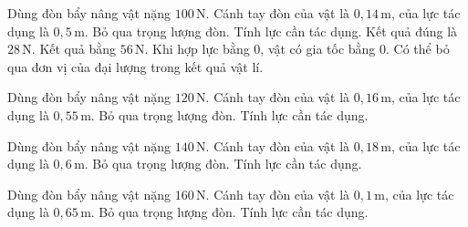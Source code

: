 \begin{ex}
Dùng đòn bẩy nâng vật nặng $100\,\text{N}$. Cánh tay đòn của vật là $0,14\,\text{m}$, của lực tác dụng là $0,5\,\text{m}$. Bỏ qua trọng lượng đòn. Tính lực cần tác dụng.
\choiceTF
{\True Kết quả đúng là $28\,\text{N}$.}
{Kết quả bằng $56\,\text{N}$.}
{\True Khi hợp lực bằng 0, vật có gia tốc bằng 0.}
{Có thể bỏ qua đơn vị của đại lượng trong kết quả vật lí.}
\end{ex}

\begin{ex}
Dùng đòn bẩy nâng vật nặng $120\,\text{N}$. Cánh tay đòn của vật là $0,16\,\text{m}$, của lực tác dụng là $0,55\,\text{m}$. Bỏ qua trọng lượng đòn. Tính lực cần tác dụng.
\end{ex}

\begin{ex}
Dùng đòn bẩy nâng vật nặng $140\,\text{N}$. Cánh tay đòn của vật là $0,18\,\text{m}$, của lực tác dụng là $0,6\,\text{m}$. Bỏ qua trọng lượng đòn. Tính lực cần tác dụng.
\end{ex}

\begin{ex}
Dùng đòn bẩy nâng vật nặng $160\,\text{N}$. Cánh tay đòn của vật là $0,1\,\text{m}$, của lực tác dụng là $0,65\,\text{m}$. Bỏ qua trọng lượng đòn. Tính lực cần tác dụng.
\end{ex}

